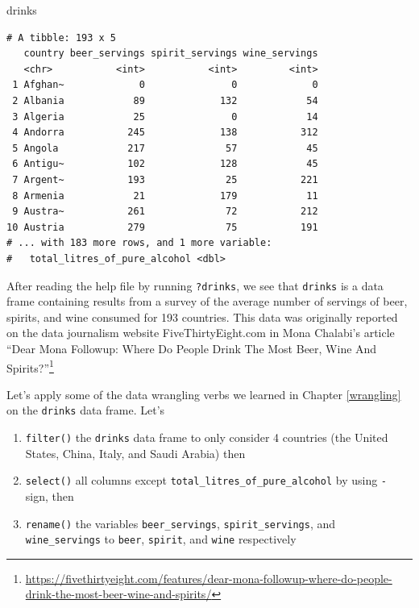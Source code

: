 \documentclass[12pt, krantz2,]{krantz}
\makeatletter
\newenvironment{Shaded}{\begin{snugshade}}{\end{snugshade}}
\newcommand{\NormalTok}[1]{#1}
\providecommand{\tightlist}{%
  \setlength{\itemsep}{0pt}\setlength{\parskip}{0pt}}
\renewcommand{\href}[2]{#2\footnote{\url{#1}}}
\newenvironment{kframe}{%
\medskip{}
\setlength{\fboxsep}{.8em}
 \def\at@end@of@kframe{}%
 \ifinner\ifhmode%
  \def\at@end@of@kframe{\end{minipage}}%
  \begin{minipage}{\columnwidth}%
 \fi\fi%
 \def\FrameCommand##1{\hskip\@totalleftmargin \hskip-\fboxsep
 \colorbox{shadecolor}{##1}\hskip-\fboxsep
     \hskip-\linewidth \hskip-\@totalleftmargin \hskip\columnwidth}%
 \MakeFramed {\advance\hsize-\width
   \@totalleftmargin\z@ \linewidth\hsize
   \@setminipage}}%
 {\par\unskip\endMakeFramed%
 \at@end@of@kframe}
\renewenvironment{Shaded}{\begin{kframe}}{\end{kframe}}
\makeatother
\begin{document}
\begin{Shaded}
\begin{Highlighting}[]
\NormalTok{drinks}
\end{Highlighting}
\end{Shaded}

\begin{verbatim}
# A tibble: 193 x 5
   country beer_servings spirit_servings wine_servings
   <chr>           <int>           <int>         <int>
 1 Afghan~             0               0             0
 2 Albania            89             132            54
 3 Algeria            25               0            14
 4 Andorra           245             138           312
 5 Angola            217              57            45
 6 Antigu~           102             128            45
 7 Argent~           193              25           221
 8 Armenia            21             179            11
 9 Austra~           261              72           212
10 Austria           279              75           191
# ... with 183 more rows, and 1 more variable:
#   total_litres_of_pure_alcohol <dbl>
\end{verbatim}

After reading the help file by running \texttt{?drinks}, we see that \texttt{drinks} is a data frame containing results from a survey of the average number of servings of beer, spirits, and wine consumed for 193 countries. This data was originally reported on the data journalism website FiveThirtyEight.com in Mona Chalabi's article \href{https://fivethirtyeight.com/features/dear-mona-followup-where-do-people-drink-the-most-beer-wine-and-spirits/}{``Dear Mona Followup: Where Do People Drink The Most Beer, Wine And Spirits?''}

Let's apply some of the data wrangling verbs we learned in Chapter \ref{wrangling} on the \texttt{drinks} data frame. Let's

\begin{enumerate}
\def\labelenumi{\arabic{enumi}.}
\tightlist
\item
  \texttt{filter()} the \texttt{drinks} data frame to only consider 4 countries (the United States, China, Italy, and Saudi Arabia) then
\item
  \texttt{select()} all columns except \texttt{total\_litres\_of\_pure\_alcohol} by using \texttt{-} sign, then
\item
  \texttt{rename()} the variables \texttt{beer\_servings}, \texttt{spirit\_servings}, and \texttt{wine\_servings} to \texttt{beer}, \texttt{spirit}, and \texttt{wine} respectively
\end{enumerate}
\end{document}
